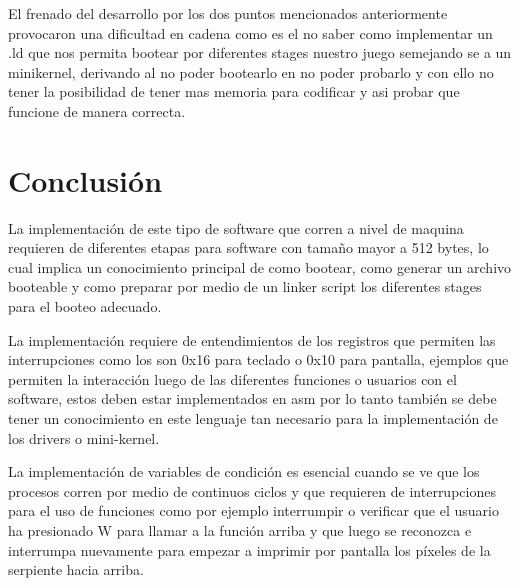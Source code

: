 \documentclass[twocolumn,11pts]{IEEEtran}
\begin{document}
El frenado del desarrollo por los dos puntos mencionados anteriormente provocaron una dificultad en cadena como es el no saber como implementar un .ld que nos permita bootear por diferentes stages nuestro juego semejando se a un minikernel, derivando al no poder bootearlo en no poder probarlo y con ello no tener la posibilidad de tener mas memoria para codificar y asi probar que funcione de manera correcta.


\section{Conclusión}

La implementación de este tipo de software que corren a nivel de maquina requieren de diferentes etapas para software con tamaño mayor a 512 bytes, lo cual implica un conocimiento principal de como bootear, como generar un archivo booteable y como preparar por medio de un linker script los diferentes stages para el booteo adecuado.

La implementación requiere de entendimientos de los registros que permiten las interrupciones como los son 0x16 para teclado o 0x10 para pantalla, ejemplos que permiten la interacción luego de las diferentes funciones o usuarios con el software, estos deben estar implementados en asm por lo tanto también se debe tener un conocimiento en este lenguaje tan necesario para la implementación de los drivers o mini-kernel.

La implementación de variables de condición es esencial cuando se ve que los procesos corren por medio de continuos ciclos y que requieren de interrupciones para el uso de funciones como por ejemplo interrumpir o verificar que el usuario ha presionado W para llamar a la función arriba y que luego se reconozca e interrumpa nuevamente para empezar a imprimir por pantalla los píxeles de la serpiente hacia arriba. 








  
\end{document}
